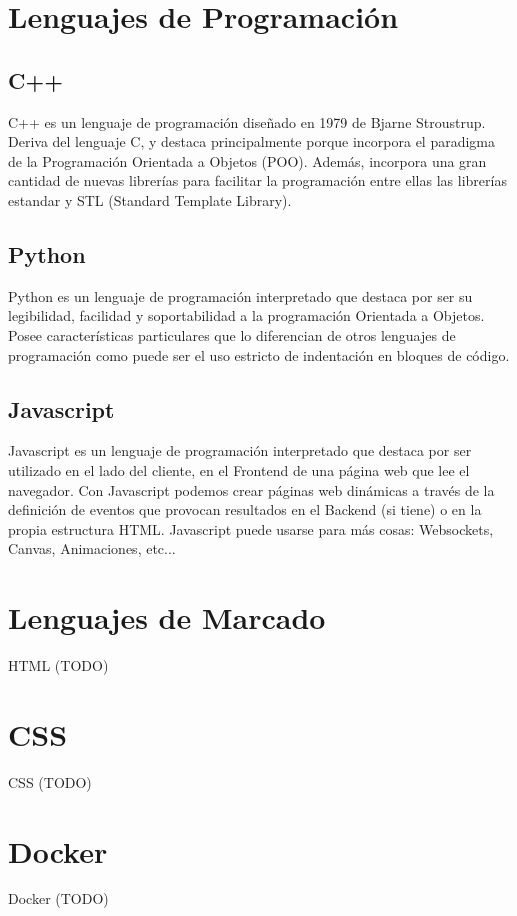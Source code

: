 \section{Lenguajes de Programación}
\subsection{C++}
\label{sec:c++}

C++ es un lenguaje de programación diseñado en 1979 de Bjarne Stroustrup. Deriva del lenguaje C, y destaca principalmente porque incorpora el paradigma de la Programación Orientada a Objetos (POO). Además, incorpora una gran cantidad de nuevas librerías para facilitar la programación entre ellas las librerías estandar y STL (Standard Template Library).

\subsection{Python}
\label{sec:python}

Python es un lenguaje de programación interpretado que destaca por ser su legibilidad, facilidad y soportabilidad a la programación Orientada a Objetos. Posee características particulares que lo diferencian de otros lenguajes de programación como puede ser el uso estricto de indentación en bloques de código.

\subsection{Javascript}
\label{sec:javascript}

Javascript es un lenguaje de programación interpretado que destaca por ser utilizado en el lado del cliente, en el Frontend de una página web que lee el navegador. Con Javascript podemos crear páginas web dinámicas a través de la definición de eventos que provocan resultados en el Backend (si tiene) o en la propia estructura HTML. Javascript puede usarse para más cosas: Websockets, Canvas, Animaciones, etc...

\section{Lenguajes de Marcado}
\label{sec:html}

HTML (TODO)

\section{CSS}
\label{sec:css}

CSS (TODO)

\section{Docker}
\label{sec:docker}

Docker (TODO)
